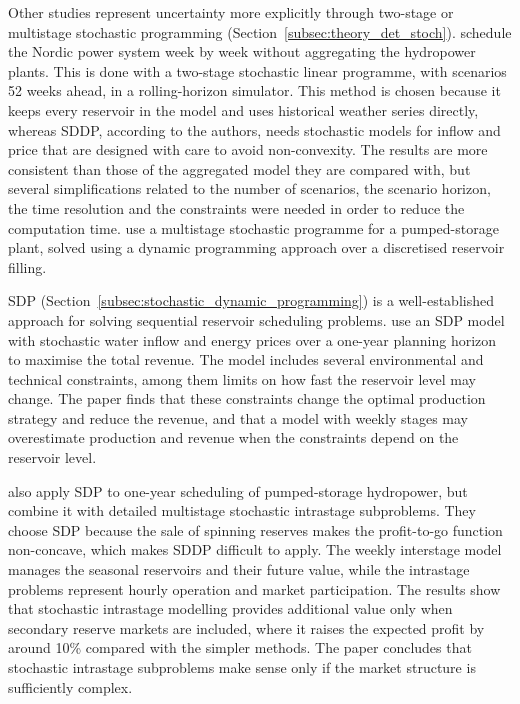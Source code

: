 Other studies represent uncertainty more explicitly through two-stage or multistage stochastic programming (Section~\ref{subsec:theory_det_stoch}). \textcite{helseth2017} %
schedule the Nordic power system week by week without aggregating the hydropower plants. This is done with a two-stage stochastic linear programme, with scenarios 52 weeks ahead, in a rolling-horizon simulator. This method is chosen because it keeps every reservoir in the model and uses historical weather series directly, whereas SDDP, according to the authors, needs stochastic models for inflow and price that are designed with care to avoid non-convexity. The results are more consistent than those of the aggregated model they are compared with, but several simplifications related to the number of scenarios, the scenario horizon, the time resolution and the constraints were needed in order to reduce the computation time. \textcite{abgottspon2013} %
use a multistage stochastic programme for a pumped-storage plant, solved using a dynamic programming approach over a discretised reservoir filling.

SDP (Section~\ref{subsec:stochastic_dynamic_programming}) is a well-established approach for solving sequential reservoir scheduling problems. %
\textcite{alic2023} %
use an SDP model with stochastic water inflow and energy prices over a one-year planning horizon to maximise the total revenue. The model includes several environmental and technical constraints, among them limits on how fast the reservoir level may change. The paper finds that these constraints change the optimal production strategy and reduce the revenue, and that a model with weekly stages may overestimate production and revenue when the constraints depend on the reservoir level.

\textcite{abgottspon2014} %
also apply SDP to one-year scheduling of pumped-storage hydropower, but combine it with detailed multistage stochastic intrastage subproblems. They choose SDP because the sale of spinning reserves makes the profit-to-go function non-concave, which makes SDDP difficult to apply. The weekly interstage model manages the seasonal reservoirs and their future value, while the intrastage problems represent hourly operation and market participation. The results show that stochastic intrastage modelling provides additional value only when secondary reserve markets are included, where it raises the expected profit by around 10\% compared with the simpler methods. The paper concludes that stochastic intrastage subproblems make sense only if the market structure is sufficiently complex.

